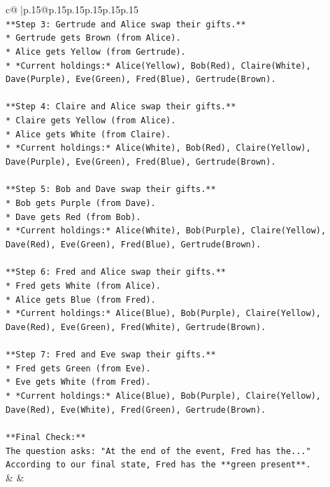 \documentclass{article}
\begin{document}
{\begin{supertabular}{c@{$\;$}|p{.15\linewidth}@{}p{.15\linewidth}p{.15\linewidth}p{.15\linewidth}p{.15\linewidth}p{.15\linewidth}}
{{{\\ 
\texttt{**Step 3: Gertrude and Alice swap their gifts.**} \\
\texttt{*   Gertrude gets Brown (from Alice).} \\
\texttt{*   Alice gets Yellow (from Gertrude).} \\
\texttt{*   *Current holdings:* Alice(Yellow), Bob(Red), Claire(White), Dave(Purple), Eve(Green), Fred(Blue), Gertrude(Brown).} \\
\\ 
\texttt{**Step 4: Claire and Alice swap their gifts.**} \\
\texttt{*   Claire gets Yellow (from Alice).} \\
\texttt{*   Alice gets White (from Claire).} \\
\texttt{*   *Current holdings:* Alice(White), Bob(Red), Claire(Yellow), Dave(Purple), Eve(Green), Fred(Blue), Gertrude(Brown).} \\
\\ 
\texttt{**Step 5: Bob and Dave swap their gifts.**} \\
\texttt{*   Bob gets Purple (from Dave).} \\
\texttt{*   Dave gets Red (from Bob).} \\
\texttt{*   *Current holdings:* Alice(White), Bob(Purple), Claire(Yellow), Dave(Red), Eve(Green), Fred(Blue), Gertrude(Brown).} \\
\\ 
\texttt{**Step 6: Fred and Alice swap their gifts.**} \\
\texttt{*   Fred gets White (from Alice).} \\
\texttt{*   Alice gets Blue (from Fred).} \\
\texttt{*   *Current holdings:* Alice(Blue), Bob(Purple), Claire(Yellow), Dave(Red), Eve(Green), Fred(White), Gertrude(Brown).} \\
\\ 
\texttt{**Step 7: Fred and Eve swap their gifts.**} \\
\texttt{*   Fred gets Green (from Eve).} \\
\texttt{*   Eve gets White (from Fred).} \\
\texttt{*   *Current holdings:* Alice(Blue), Bob(Purple), Claire(Yellow), Dave(Red), Eve(White), Fred(Green), Gertrude(Brown).} \\
\\ 
\texttt{**Final Check:**} \\
\texttt{The question asks: "At the end of the event, Fred has the..."} \\
\texttt{According to our final state, Fred has the **green present**.} \\
            }
        }
    }
    & & \\ \\


\end{supertabular}}
\end{document}
